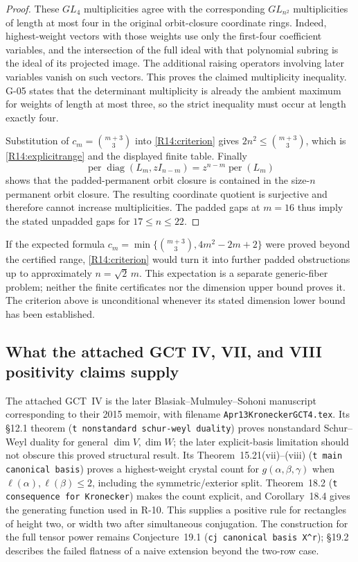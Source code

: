 \documentclass[11pt,a4paper]{article}
\theoremstyle{definition}\newtheorem{definition}{Definition}
\begin{document}
\begin{proof}
These $GL_4$ multiplicities agree with the corresponding
$GL_{n^2}$ multiplicities of length at most four in the original
orbit-closure coordinate rings. Indeed, highest-weight vectors
with those weights use only the first-four coefficient variables,
and the intersection of the full ideal with that polynomial
subring is the ideal of its projected image. The additional
raising operators involving later variables vanish on such
vectors. This proves the claimed multiplicity inequality.
G-05 states that the determinant multiplicity is already the
ambient maximum for weights of length at most three, so the
strict inequality must occur at length exactly four.

Substitution of $c_m=\binom{m+3}{3}$ into
\eqref{R14:criterion} gives $2n^2\leq\binom{m+3}{3}$, which is
\eqref{R14:explicitrange} and the displayed finite table.
Finally
\[
 \operatorname{per}\operatorname{diag}(L_m,zI_{n-m})
 =z^{n-m}\operatorname{per}(L_m)
\]
shows that the padded-permanent orbit closure is contained in
the size-$n$ permanent orbit closure. The resulting coordinate
quotient is surjective and therefore cannot increase
multiplicities. The padded gaps at $m=16$ thus imply the stated
unpadded gaps for $17\leq n\leq22$.
\end{proof}

If the expected formula
$c_m=\min\{\binom{m+3}{3},4m^2-2m+2\}$ were proved beyond the
certified range, \eqref{R14:criterion} would turn it into further
padded obstructions up to approximately $n=\sqrt2\,m$.
This expectation is a separate generic-fiber problem; neither
the finite certificates nor the dimension upper bound proves it.
The criterion above is unconditional whenever its stated
dimension lower bound has been established.

\subsection{What the attached GCT IV, VII, and VIII positivity claims supply}

The attached GCT~IV is the later Blasiak--Mulmuley--Sohoni manuscript
corresponding to their 2015 memoir, with filename
\texttt{Apr13KroneckerGCT4.tex}. Its \S12.1 theorem
(\texttt{t nonstandard schur-weyl duality}) proves nonstandard
Schur--Weyl duality for general $\dim V,\dim W$; the later
explicit-basis limitation should not obscure this proved
structural result. Its Theorem~15.21(vii)--(viii)
(\texttt{t main canonical basis}) proves a highest-weight crystal
count for $g(\alpha,\beta,\gamma)$ when
$\ell(\alpha),\ell(\beta)\leq2$, including the symmetric/exterior
split. Theorem~18.2 (\texttt{t consequence for Kronecker}) makes
the count explicit, and Corollary~18.4 gives the generating
function used in R-10. This supplies a positive rule for rectangles
of height two, or width two after simultaneous conjugation.
The construction for the full tensor power remains Conjecture~19.1
(\texttt{cj canonical basis X\^{}r}); \S19.2 describes the failed
flatness of a naive extension beyond the two-row case.
\end{document}
